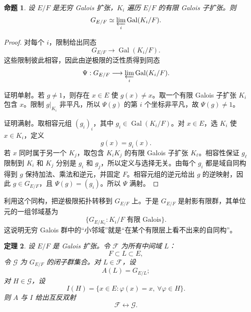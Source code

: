 \documentclass[11pt,a4paper,openany]{ctexbook}
\numberwithin{equation}{chapter}
\newcommand{\Gal}{\operatorname{Gal}}
\theoremstyle{plain}
\newtheorem{theorem}{定理}[chapter]
\newtheorem{proposition}[theorem]{命题}
\theoremstyle{definition}
\theoremstyle{remark}
\begin{document}
\begin{proposition}
设 $E/F$ 是无穷 Galois 扩张，$K_i$ 遍历 $E/F$ 的有限 Galois 子扩张。则
\[
G_{E/F}\simeq \varprojlim_i \Gal(K_i/F).
\]
\end{proposition}

\begin{proof}
对每个 $i$，限制给出同态
\[
G_{E/F}\longrightarrow \Gal(K_i/F).
\]
这些限制彼此相容，因此由逆极限的泛性质得到同态
\[
\Psi:G_{E/F}\longrightarrow \varprojlim_i\Gal(K_i/F).
\]

证明单射。若 $g\ne1$，则存在 $x\in E$ 使 $g(x)\ne x$。取一个有限 Galois 子扩张 $K_i$ 包含 $x$。限制 $g|_{K_i}$ 非平凡，所以 $\Psi(g)$ 的第 $i$ 个坐标非平凡，故 $\Psi(g)\ne1$。

证明满射。取相容元组 $(g_i)_i$，其中 $g_i\in\Gal(K_i/F)$。对 $x\in E$，选 $K_i$ 使 $x\in K_i$，定义
\[
g(x)=g_i(x).
\]
若 $x$ 同时属于另一个 $K_j$，取包含 $K_iK_j$ 的有限 Galois 子扩张 $K_\ell$。相容性保证 $g_\ell$ 限制到 $K_i$ 和 $K_j$ 分别是 $g_i$ 和 $g_j$，所以定义与选择无关。由每个 $g_i$ 都是域自同构得到 $g$ 保持加法、乘法和逆元，并固定 $F$。相容元组的逆元给出 $g$ 的逆映射，因此 $g\in G_{E/F}$，且 $\Psi(g)=(g_i)$。所以 $\Psi$ 满射。
\end{proof}

利用这个同构，把逆极限拓扑转移到 $G_{E/F}$ 上。于是 $G_{E/F}$ 是射影有限群，其单位元的一组邻域基为
\[
\{G_{E/K_i}:K_i/F\text{ 有限 Galois}\}.
\]
这说明无穷 Galois 群中的“小邻域”就是“在某个有限层上看不出来的自同构”。

\begin{theorem}
设 $E/F$ 是 Galois 扩张。令 $\mathcal F$ 为所有中间域 $L$：
\[
F\subset L\subset E,
\]
令 $\mathcal G$ 为 $G_{E/F}$ 的闭子群集合。对 $L\in\mathcal F$，设
\[
A(L)=G_{E/L};
\]
对 $H\in\mathcal G$，设
\[
I(H)=\{x\in E:\varphi(x)=x,\ \forall\varphi\in H\}.
\]
则 $A$ 与 $I$ 给出互反双射
\[
\mathcal F\longleftrightarrow \mathcal G.
\]
\end{theorem}
\end{document}
